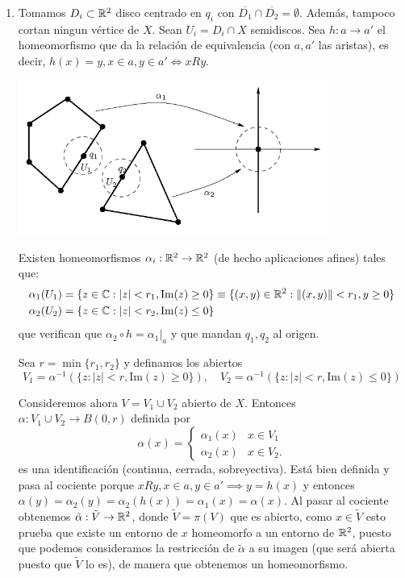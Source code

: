 {\begin{enumerate}
        \item Tomamos $D_i \subset \mathbb{R}^2$ disco centrado en $q_i$ con $\overline{D_1} \cap \overline{D_2} = \emptyset$. Además, tampoco cortan ningun vértice de $X$.
        Sean $U_i = D_i \cap X$ semidiscos. Sea $h : a \to a'$ el homeomorfismo que da la relación de equivalencia (con $a, a'$ las aristas), es decir, $h(x)=y, x \in a, y \in a' \iff xRy$. 
        
        \begin{center}
            \includegraphics[width=0.8\textwidth]{img/entornos-aristas.png}
        \end{center}

        Existen homeomorfismos $\alpha_i : \mathbb{R}^2 \to \mathbb{R}^2$ (de hecho aplicaciones afines) tales que: 
        \begin{align*}
        \alpha_1(U_1) &= \{z\in \mathbb{C} : |z| < r_1, \text{Im}(z) \ge 0\} \equiv \{(x,y)\in\mathbb{R}^2 : \|(x,y)\| < r_1, y \ge 0\}\\
        \alpha_2(U_2) &= \{z\in \mathbb{C} : |z| < r_2, \text{Im}(z) \le 0\}
        \end{align*}
        que verifican que $\alpha_2 \circ h = \alpha_1|_a$ y que mandan $q_1,q_2$ al origen.
        
        Sea $r = \min\{r_1, r_2\}$ y definamos los abiertos
        \[
        V_1 = \alpha^{-1}(\{z : |z|<r, \text{Im}(z) \ge 0\}),\quad V_2 = \alpha^{-1}(\{z : |z|<r, \text{Im}(z) \le 0\})
        \]
        
        Consideremos ahora $V=V_1 \cup V_2$ abierto de $X$. Entonces $\alpha : V_1 \cup V_2 \to B(0,r)$ definida por 
        \[
        \alpha(x) = \begin{cases}
            \alpha_1(x) & x \in V_1 \\
            \alpha_2(x) & x \in V_2.
        \end{cases}
        \]
        es una identificación (continua, cerrada, sobreyectiva). Está bien definida y pasa al cociente porque $xRy, x\in a, y \in a' \implies y = h(x)$ y entonces $\alpha(y) = \alpha_2(y) = \alpha_2(h(x)) = \alpha_1(x) = \alpha(x)$. Al pasar al cociente obtenemos $\tilde{\alpha}:\tilde{V}\to\mathbb{R}^2$, donde $\tilde{V}=\pi(V)$ que es abierto, como $x\in\tilde{V}$ esto prueba que existe un entorno de $x$ homeomorfo a un entorno de $\mathbb{R}^2$, puesto que podemos consideramos la restricción de $\tilde{\alpha}$ a su imagen (que será abierta puesto que $\tilde{V}$ lo es), de manera que obtenemos un homeomorfismo.


\end{enumerate}}
